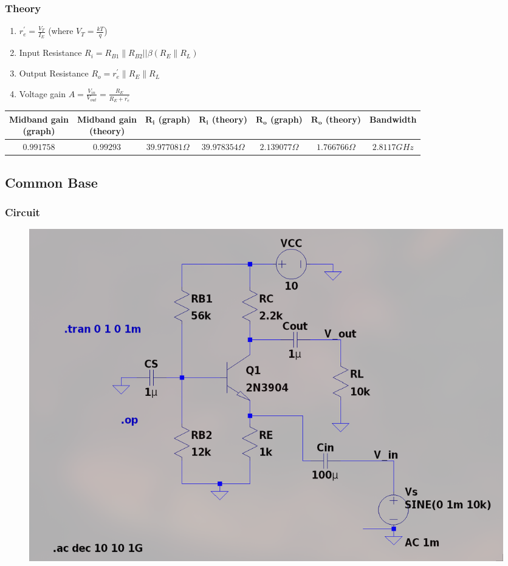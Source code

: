 \documentclass{article}
\begin{document}
\subsubsection{Theory}
\begin{enumerate}
    \item $r_e^{\prime} = \frac{V_T}{I_E}$  (where $V_T = \frac{kT}{q}$)
    \item Input Resistance $R_i = R_{B1} \parallel R_{B2} || \beta(R_E \parallel R_L) $
    \item Output Resistance $R_o = r_e^{\prime} \parallel R_E \parallel R_L$ 
    \item Voltage gain $A = \frac{V_{in}}{V_{out}} = \frac{R_E}{R_E + r_e^{\prime}}$ 
\end{enumerate} 
\begin{tabular}{|c|c|c|c|c|c|c|}
\hline
\makecell{\textbf{Midband gain} \\ \textbf{(graph)}} & \makecell{\textbf{Midband gain} \\ \textbf{(theory)}} & \makecell{$\mathbf{R_i}$ \\ \textbf{(graph)}} & \makecell{{$\mathbf{R_i}$} \\ \textbf{(theory)}} & \makecell{{$\mathbf{R_o}$} \\ \textbf{(graph)}} & \makecell{{$\mathbf{R_o}$} \\ \textbf{(theory)}} & \textbf{Bandwidth} \\
\hline
$0.991758$ & $0.99293$ & $39.977081\Omega$ & $39.978354\Omega $& $2.139077\Omega$ & $1.766766\Omega$ & $2.8117GHz$ \\
\hline
\end{tabular}
\pagebreak
\subsection{Common Base}
\subsubsection{Circuit}
\begin{figure}[h!]
        \centering
        \includegraphics[width=0.7\linewidth]{figs/bjt_cb_ckt.png}
    \end{figure}
\end{document}
